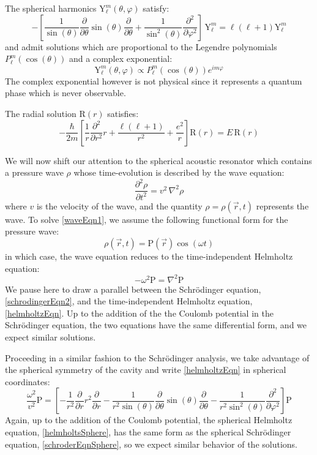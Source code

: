 \documentclass[12pt]{article}
\newcommand{\ppd}[1]{\frac{\partial}{\partial#1}}
\newcommand{\ppsd}[1]{\frac{\partial^2}{\partial #1^2}}
\newcommand{\ppsnd}[2]{\frac{\partial^2 #1}{\partial #2^2}}
\newcommand{\lap}{\nabla^2}
\begin{document}
The spherical harmonics $\mathrm{Y}_\ell^m(\theta,\varphi)$ satisfy:
\begin{equation}
\label{sphericalHarmonic}
	-\left[ \frac{1}{\sin(\theta)}\ppd{\theta}\sin(\theta)\ppd{\theta} + \frac{1}{\sin^2(\theta)} \ppsd{\varphi} \right] \, \mathrm{Y}_\ell^m = \ell(\ell+1)\mathrm{Y}_\ell^m
\end{equation}
and admit solutions which are proportional to the Legendre polynomials $P_\ell^m(\cos(\theta))$ and a complex exponential:
\begin{equation}
	\mathrm{Y}_\ell^m(\theta,\varphi) \propto P_\ell^m(\cos(\theta))e^{im\varphi}
\end{equation}
The complex exponential however is not physical since it represents a quantum phase which is never observable.

The radial solution $\mathrm{R}(r)$ satisfies:
\begin{equation}
\label{radialSoln}
	- \frac{\hbar}{2m} \left[ \frac{1}{r} \ppsd{r}r + \frac{\ell(\ell+1)}{r^2} + \frac{e^2}{r} \right] \mathrm{R}(r) = E \, \mathrm{R}(r)
\end{equation}


We will now shift our attention to the spherical acoustic resonator which contains a pressure wave $\rho$ whose time-evolution is described by the wave equation:
\begin{equation}
	\label{waveEqn1}
	\ppsnd{\rho}{t} = v^2 \, \lap\rho
\end{equation}
where $v$ is the velocity of the wave, and the quantity $\rho = \rho(\vec{r},t)$ represents the wave. To solve \eqref{waveEqn1}, we assume the following functional form for the pressure wave:
\begin{equation}
\label{waveSoln}
	\rho(\vec{r},t) = \mathrm{P}(\vec{r})\cos(\omega t)
\end{equation}
in which case, the wave equation reduces to the time-independent Helmholtz equation:
\begin{equation}
\label{helmholtzEqn}
	-\omega^2 \mathrm{P} = \lap \mathrm{P}
\end{equation}
We pause here to draw a parallel between the Schr\"odinger equation, \eqref{schrodingerEqn2}, and the time-independent Helmholtz equation, \eqref{helmholtzEqn}. Up to the addition of the the Coulomb potential in the Schr\"odinger equation, the two equations have the same differential form, and we expect similar solutions.

Proceeding in a similar fashion to the Schr\"odinger analysis, we take advantage of the spherical symmetry of the cavity and write \eqref{helmholtzEqn} in spherical coordinates:
\begin{equation}
\label{helmholtsSphere}
	\frac{\omega^2}{v^2} \mathrm{P} = \left[ -\frac{1}{r^2} \ppd{r}r^2\ppd{r} - \frac{1}{r^2\sin(\theta)}\ppd{\theta}\sin(\theta)\ppd{\theta} -\frac{1}{r^2\sin^2(\theta)} \ppsd{\varphi} \right] \mathrm{P}
\end{equation}
Again, up to the addition of the Coulomb potential, the spherical Helmholtz equation, \eqref{helmholtsSphere}, has the same form as the spherical Schr\"odinger equation,  \eqref{schroderEqnSphere}, so we expect similar behavior of the solutions.
\end{document}
